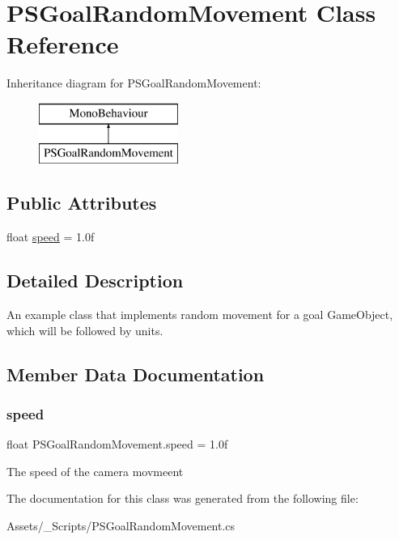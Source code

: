 \hypertarget{class_p_s_goal_random_movement}{}\section{P\+S\+Goal\+Random\+Movement Class Reference}
\label{class_p_s_goal_random_movement}
Inheritance diagram for P\+S\+Goal\+Random\+Movement\+:\begin{figure}[H]
\begin{center}
\leavevmode
\includegraphics[height=2.000000cm]{class_p_s_goal_random_movement}
\end{center}
\end{figure}
\subsection*{Public Attributes}
\begin{DoxyCompactItemize}
\item 
float \hyperlink{class_p_s_goal_random_movement_a15403bed0dac463716ea40bbc9d2db14}{speed} = 1.\+0f
\end{DoxyCompactItemize}


\subsection{Detailed Description}
An example class that implements random movement for a goal Game\+Object, which will be followed by units. 

\subsection{Member Data Documentation}
\mbox{\label{class_p_s_goal_random_movement_a15403bed0dac463716ea40bbc9d2db14}} 
\subsubsection{\texorpdfstring{speed}{speed}}
{\footnotesize\ttfamily float P\+S\+Goal\+Random\+Movement.\+speed = 1.\+0f}

The speed of the camera movmeent 

The documentation for this class was generated from the following file\+:\begin{DoxyCompactItemize}
\item 
Assets/\+\_\+\+Scripts/P\+S\+Goal\+Random\+Movement.\+cs\end{DoxyCompactItemize}
